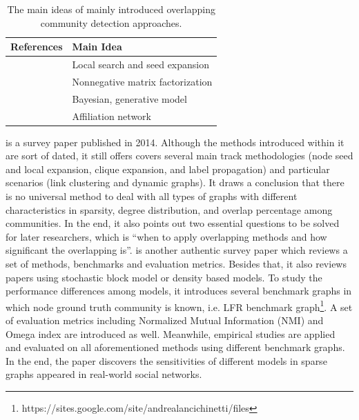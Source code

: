 \begin{table}
	\centering
	\begin{tabular}{|p{5cm}|p{9cm}|} \hline
		\textbf{References} &  \textbf{Main Idea} \\ \hline
		\cite{coscia2012demon,whang2013overlapping,whang2016overlapping,huang2018overlapping,wang2017overlapping} & Local search and seed expansion\\ \hline
		\cite{yang2013overlapping,zhang2015incorporating,zhang2016modeling,eustace2015overlapping,jin2015combined}& Nonnegative matrix factorization\\ \hline
		\cite{gopalan2013efficient,jin2016detect,}& Bayesian, generative model\\ \hline
		\cite{yang2012community}& Affiliation network\\ \hline
	\end{tabular}
	\caption{The main ideas of mainly introduced overlapping community detection approaches.}
	\label{tab:c2_overlapping}
	
\end{table} 

\cite{amelio2014overlapping} is a survey paper published in 2014. Although the methods introduced within it are sort of dated, it still offers covers several main track methodologies (node seed and local expansion, clique expansion, and label propagation) and particular scenarios (link clustering and dynamic graphs). It draws a conclusion that there is no universal method to deal with all types of graphs with different characteristics in sparsity, degree distribution, and overlap percentage among communities. In the end, it also points out two essential questions to be solved for later researchers, which is ``when to apply overlapping methods and how significant the overlapping is''.  \cite{xie2013overlapping} is another authentic survey paper which reviews a set of methods, benchmarks and evaluation metrics. Besides that, it also reviews papers using stochastic block model or density based models. To study the performance differences among models,  it introduces several benchmark graphs in which node ground truth community is known, i.e. LFR benchmark graph\footnote{https://sites.google.com/site/andrealancichinetti/files}. A set of evaluation metrics including Normalized Mutual Information (NMI) and Omega index are introduced as well. Meanwhile, empirical studies are applied and evaluated on all aforementioned methods using different benchmark graphs. In the end, the paper discovers the sensitivities of different models in sparse graphs appeared in real-world social networks.

